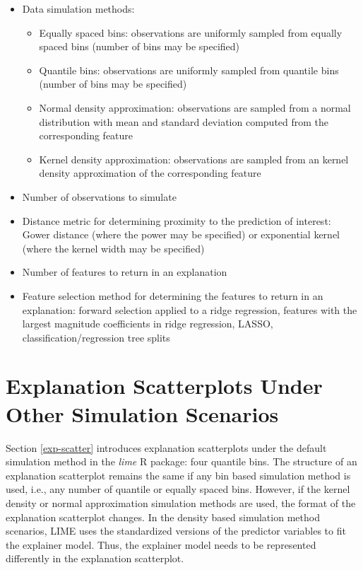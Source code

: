 \documentclass[AMS,STIX2COL]{WileyNJD-v2}\usepackage[]{graphicx}\usepackage[]{color}
\begin{document}
\begin{itemize}

\item Data simulation methods:

\begin{itemize}
\item Equally spaced bins: observations are uniformly sampled from equally spaced bins (number of bins may be specified)
\item Quantile bins: observations are uniformly sampled from quantile bins (number of bins may be specified)
\item Normal density approximation: observations are sampled from a normal distribution with mean and standard deviation computed from the corresponding feature
\item Kernel density approximation: observations are sampled from an kernel density approximation of the corresponding feature
\end{itemize}

\item Number of observations to simulate

\item Distance metric for determining proximity to the prediction of interest: Gower distance (where the power may be specified) or exponential kernel (where the kernel width may be specified)

\item Number of features to return in an explanation

\item Feature selection method for determining the features to return in an explanation: forward selection applied to a ridge regression, features with the largest magnitude coefficients in ridge regression, LASSO, classification/regression tree splits

\end{itemize}

\section{Explanation Scatterplots Under Other Simulation Scenarios} \label{exp-scatter_plus}

Section \ref{exp-scatter} introduces explanation scatterplots under the default simulation method in the \emph{lime} R package: four quantile bins. The structure of an explanation scatterplot remains the same if any bin based simulation method is used, i.e., any number of quantile or equally spaced bins. However, if the kernel density or normal approximation simulation methods are used, the format of the explanation scatterplot changes. In the density based simulation method scenarios, LIME uses the standardized versions of the predictor variables to fit the explainer model. Thus, the explainer model needs to be represented differently in the explanation scatterplot.
\end{document}

